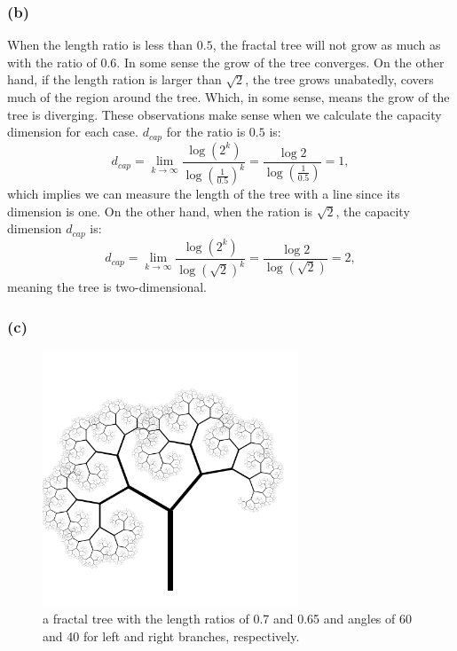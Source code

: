 \documentclass{article}
\begin{document}
\subsubsection*{(b)}
When the length ratio is less than $0.5$, the fractal tree will not grow as much as with the ratio of $0.6$. In some sense the grow of the tree converges. On the other hand, if the length ration is larger than $\sqrt{2}$, the tree grows unabatedly, covers much of the region around the tree. Which, in some sense, means the grow of the tree is diverging. These observations make sense when we calculate the capacity dimension for each case. $d_{cap}$ for the ratio is $0.5$ is:
\[
	d_{cap} = \lim_{k  \to \infty}\frac{\log(2^k)}{\log\left( \frac{1}{0.5} \right)^k} = \frac{\log2}{\log\left( \frac{1}{0.5} \right)} = 1,
\]
which implies we can measure the length of the tree with a line since its dimension is one. On the other hand, when the ration is $\sqrt{2}$, the capacity dimension $d_{cap}$ is:
\[
	d_{cap} = \lim_{k  \to \infty}\frac{\log(2^k)}{\log\left( \sqrt{2} \right)^k} = \frac{\log2}{\log\left( \sqrt{2} \right)} = 2,
\]
meaning the tree is two-dimensional.

\subsubsection*{(c)}
\begin{figure}[hb]
	\centering
	\includegraphics[height=3in]{figs/fractal-tree_60_40.png}
	\caption{a fractal tree with the length ratios of 0.7 and 0.65 and angles of 60 and 40 for left and right branches, respectively.}
	\label{fractal_tree2}
\end{figure}
\end{document}
